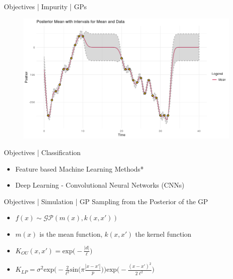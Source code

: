 \documentclass{beamer}
\begin{document}
    \begin{frame}{Objectives | Impurity | GPs}
        \begin{figure}[hbt]
        	\center
        	\includegraphics[width=1.0\textwidth]{img/gp.png}
        	\label{fig:gp}
        \end{figure}
    \end{frame}
    
     \begin{frame}{Objectives | Classification}
        \begin{itemize}
            \item Feature based Machine Learning Methods*
            \item Deep Learning - Convolutional Neural Networks (CNNs)
        \end{itemize}
    \end{frame}
    
    \begin{frame}{Objectives | Simulation | GP}
        Sampling from the Posterior of the GP
        \begin{itemize}
            \item $f(x) \sim \mathcal{GP} (m(x), k(x, x'))$
            \item $m(x)$ is the mean function, $k(x, x')$ the kernel function
            \item $K_{OU}(x, x') = \text{exp} \Big(- \frac{|d|}{\ell} \Big)$
            \item $K_{LP} = \sigma^2 \text{exp} \Big( - \frac{2}{\ell^2} \text{sin} \Big( \pi \frac{|x - x'|}{p} \Big) \Big) \text{exp} \Big( - \frac{(x - x')^2}{2\ell^2} \Big)$
            \label{fig:local_periodic_kernel}
        \end{itemize}
    \end{frame}
    
\end{document}
